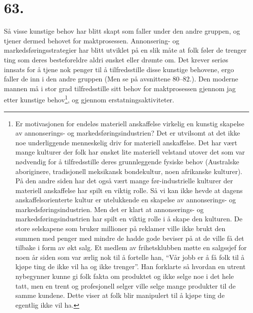 \documentclass[oneside]{book}
\begin{document}
\section*{63.}
Så visse kunstige behov har blitt skapt som faller under den andre gruppen, og
tjener dermed behovet for maktprosessen. Annonsering- og
markedsføringsstrategier har blitt utviklet på en slik måte at folk føler de
trenger ting som deres besteforeldre aldri ønsket eller drømte om. Det krever
seriøs innsats for å tjene nok penger til å tilfredsstille disse kunstige
behovene, ergo faller de inn i den andre gruppen (Men se på avsnittene 80--82.).
Den moderne mannen må i stor grad tilfredsstille sitt behov for maktprosessen
gjennom jag etter kunstige behov\footnote{Er motivasjonen for endeløs materiell
anskaffelse virkelig en kunstig skapelse av annonserings- og
markedsføringsindustrien? Det er utvilsomt at det ikke noe underliggende
menneskelig driv for materiell anskaffelse. Det har vært mange kulturer der folk
har ønsket lite materiell velstand utover det som var nødvendig for å
tilfredsstille deres grunnleggende fysiske behov (Australske aboriginere, tradisjonell meksikansk
bondekultur, noen afrikanske kulturer). På den andre siden har det også vært
mange før-industrielle kulturer der materiell anskaffelse har spilt en viktig
rolle. Så vi kan ikke hevde at dagens anskaffelsorienterte kultur er utelukkende
en skapelse av annonserings- og markedsføringsindustrien. Men det er klart at
annonserings- og markedsføringsindustrien har spilt en viktig rolle i å skape
den kulturen. De store selskapene som bruker millioner på reklamer ville ikke
brukt den summen med penger med mindre de hadde gode beviser på at de ville få
det tilbake i form av økt salg. Et medlem av frihetsklubben møtte en salgssjef
for noen år siden som var ærlig nok til å fortelle han, ``Vår jobb er å få folk
til å kjøpe ting de ikke vil ha og ikke trenger''. Han forklarte så hvordan en
utrent nybegynner kunne gi folk fakta om produktet og ikke selge noe i det hele
tatt, men en trent og profesjonell selger ville selge mange produkter til de
samme kundene. Dette viser at folk blir manipulert til å kjøpe ting de egentlig
ikke vil ha.}, og gjennom erstatningsaktiviteter.
\end{document}
